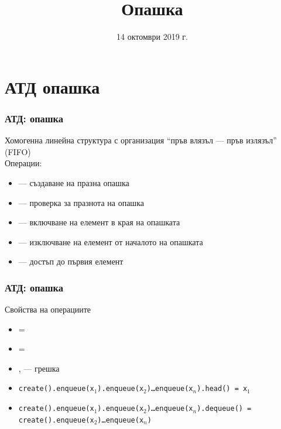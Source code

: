 \documentclass[alsotrans]{beamerswitch}
\title{Опашка}
\date{14 октомври 2019 г.}
\begin{document}
\begin{frame}
  \titlepage
\end{frame}

\section{АТД опашка}

\begin{frame}
  \frametitle{АТД: опашка}

  Хомогенна линейна структура с организация ``пръв влязъл --- пръв излязъл'' (FIFO)\\[1em]
  Операции:\\[0.5em]
  \begin{itemize}
  \item {} --- създаване на празна опашка
  \item {} --- проверка за празнота на опашка
  \item {} --- включване на елемент в края на опашката
  \item {} --- изключване на елемент от началото на опашката
  \item {} --- достъп до първия елемент
  \end{itemize}
\end{frame}

\begin{frame}
  \frametitle{АТД: опашка}

  Свойства на операциите\\[0.5em]
  \small
  \begin{itemize}
  \item {} = 
  \item {} = 
  \item {},  --- \alert{грешка}
  \item \tt{create().enqueue(x$_1$).enqueue(x$_2$)\ldots{}enqueue(x$_n$).head() = x$_1$}
  \item \tt{create().enqueue(x$_1$).enqueue(x$_2$)\ldots{}enqueue(x$_n$).dequeue() = create().enqueue(x$_2$)\ldots{}enqueue(x$_n$)}
  \end{itemize}
\end{frame}
\end{document}
